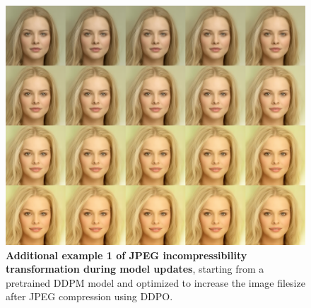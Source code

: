 \begin{appendixs}
        \begin{figure}
            \centering
            \includegraphics[scale=1.40]{img/results/incompressibility_8.png}
            \vspace{-0pt}  %
            \captionsetup{width=\textwidth} %
            \caption{\textbf{Additional example 1 of JPEG incompressibility transformation during model updates}, starting from a pretrained DDPM model and optimized to increase the image filesize after JPEG compression using DDPO.}
            \label{fig:ddpm-to-ddpo-incompressibility-extra1}
        \end{figure}



\end{appendixs}
